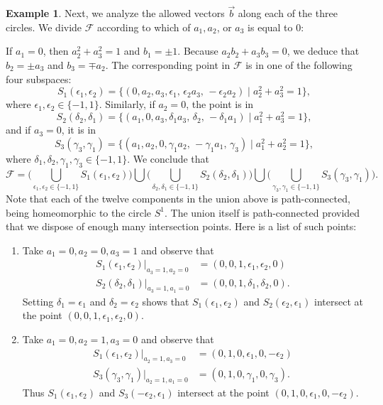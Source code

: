 \documentclass[12pt]{amsart}
\theoremstyle{definition}
\newtheorem{ex}[thm]{Example}
\theoremstyle{remark}
\begin{document}
\begin{ex}
Next, we analyze the allowed vectors $\vec{b}$ along  each of the three circles.
We  divide ${\mathcal F}$ according to which of $a_1, a_2$, or $a_3$ is equal to 0:

If $a_1 = 0$, then  $a_2^2 + a_3^2 = 1$ and $b_1 = \pm 1$. Because $a_2 b_2 + a_3 b_3 = 0$, we deduce that
$b_2=\pm a_3$ and $b_3=\mp a_2$.  The corresponding point in ${\mathcal F}$ is
in one of the following four subspaces:
    $$
    S_1(\epsilon_1, \epsilon_2) = \{(0, a_2, a_3,  \epsilon_1, \, \epsilon_2 a_3, \, -\epsilon_2 a_2 ) \mid a_2^2+a_3^2=1\},
    $$
where $\epsilon_1, \epsilon_2 \in \{-1,1\}$.
Similarly, if $a_2=0$, the point is in 
$$
    S_2(\delta_2, \delta_1) = \{( a_1, 0, a_3, \delta_1 a_3, \, \delta_2, \, -\delta_1 a_1 ) \mid a_1^2+a_3^2=1\},
    $$
and if $a_3=0$, it is in
$$
    S_3(\gamma_3, \gamma_1) = \{ (a_1, a_2, 0,  \gamma_1 a_2, \, -\gamma_1 a_1, \, \gamma_3 ) \mid a_1^2+a_2^2=1\},
    $$
where $\delta_1, \delta_2, \gamma_1, \gamma_3 \in \{-1,1\}$. 
We conclude that
$${\mathcal F}= \Big(\bigcup_{\epsilon_1, \epsilon_2 \in \{- 1, 1\} } S_1(\epsilon_1, \epsilon_2)\Big)
\bigcup \Big(\bigcup_{\delta_2, \delta_1 \in \{ -1, 1\}} S_2(\delta_2, \delta_1)\Big)
\bigcup \Big(\bigcup_{\gamma_3, \gamma_1 \in \{-1,1\}} S_3(\gamma_3, \gamma_1)\Big).
$$
Note that each of the twelve components in the union above is path-connected, being homeomorphic to the circle $S^1$. The union itself is path-connected provided that we dispose
of enough many intersection points. Here is a list of such points:


\begin{enumerate}
    \item Take $a_1=0, a_2=0, a_3=1$ and observe that
    \begin{align*}
        S_1(\epsilon_1, \epsilon_2) \Big|_{a_3=1, a_2=0} &= (0,0,1, \epsilon_1, \epsilon_2, 0) \\
        S_2(\delta_2, \delta_1) \Big|_{a_3=1, a_1=0} &= (0,0,1,\delta_1, \delta_2, 0).
    \end{align*}
    Setting $\delta_1 = \epsilon_1$ and $\delta_2 = \epsilon_2$ shows that  $S_1(\epsilon_1, \epsilon_2)$ and $S_2(\epsilon_2, \epsilon_1)$  intersect at the  point $(0, 0, 1, \epsilon_1, \epsilon_2, 0)$.
    
    \item 
  Take $a_1=0, a_2=1, a_3=0$ and observe that
    \begin{align*}
        S_1(\epsilon_1, \epsilon_2) \Big|_{a_2=1, a_3=0} &= (0,1,0,\epsilon_1, 0, -\epsilon_2) \\
        S_3(\gamma_3, \gamma_1) \Big|_{a_2=1, a_1=0} &= (0,1,0,\gamma_1, 0, \gamma_3).
    \end{align*}
    Thus $S_1(\epsilon_1, \epsilon_2)$ and $S_3(-\epsilon_2, \epsilon_1)$ intersect at the  point $(0, 1, 0, \epsilon_1, 0, -\epsilon_2)$.
    

\end{enumerate}
\end{ex}
\end{document}
